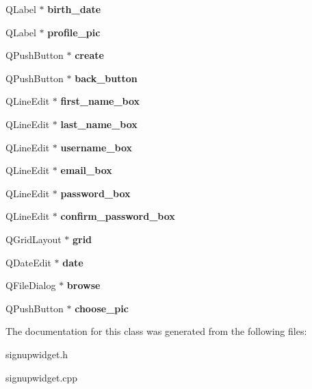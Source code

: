 \begin{DoxyCompactItemize}
Q\+Label $\ast$ {\bfseries birth\+\_\+date}
\item 
\mbox{\label{classSignUpWidget_a8a753600dab790c3b5bccf2f93b6cd19}} 
Q\+Label $\ast$ {\bfseries profile\+\_\+pic}
\item 
\mbox{\label{classSignUpWidget_accb1b4beaa669d2d891810a0f787a0ff}} 
Q\+Push\+Button $\ast$ {\bfseries create}
\item 
\mbox{\label{classSignUpWidget_aaa15c1c254772a5a01297c65cd38acef}} 
Q\+Push\+Button $\ast$ {\bfseries back\+\_\+button}
\item 
\mbox{\label{classSignUpWidget_ad9f995214bd2ecaa2af05560d337ba8e}} 
Q\+Line\+Edit $\ast$ {\bfseries first\+\_\+name\+\_\+box}
\item 
\mbox{\label{classSignUpWidget_ab531f28d8a8fd43bdc4b082eb5a03b19}} 
Q\+Line\+Edit $\ast$ {\bfseries last\+\_\+name\+\_\+box}
\item 
\mbox{\label{classSignUpWidget_ade0126b2def6836a9af479b411db33d8}} 
Q\+Line\+Edit $\ast$ {\bfseries username\+\_\+box}
\item 
\mbox{\label{classSignUpWidget_a1a16c6e69a787d4789ae5e2e6aac4c65}} 
Q\+Line\+Edit $\ast$ {\bfseries email\+\_\+box}
\item 
\mbox{\label{classSignUpWidget_a5fdab01ff0659f8c78edce86dd98cb9d}} 
Q\+Line\+Edit $\ast$ {\bfseries password\+\_\+box}
\item 
\mbox{\label{classSignUpWidget_a59d1e8bc78a8a6e198f429d7ceb1c02f}} 
Q\+Line\+Edit $\ast$ {\bfseries confirm\+\_\+password\+\_\+box}
\item 
\mbox{\label{classSignUpWidget_aefd2037eaac426a55e70ef6012b6ad18}} 
Q\+Grid\+Layout $\ast$ {\bfseries grid}
\item 
\mbox{\label{classSignUpWidget_a2e9bd8ed6cff8539ef9674ea4a51e9ba}} 
Q\+Date\+Edit $\ast$ {\bfseries date}
\item 
\mbox{\label{classSignUpWidget_a3f831471d861ba3af213a77396a23578}} 
Q\+File\+Dialog $\ast$ {\bfseries browse}
\item 
\mbox{\label{classSignUpWidget_a33a531fb9826e6487a73024007092365}} 
Q\+Push\+Button $\ast$ {\bfseries choose\+\_\+pic}
\end{DoxyCompactItemize}


The documentation for this class was generated from the following files\+:\begin{DoxyCompactItemize}
\item 
signupwidget.\+h\item 
signupwidget.\+cpp\end{DoxyCompactItemize}
